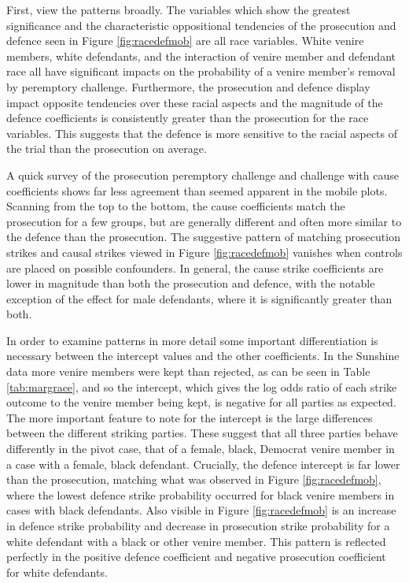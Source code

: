 First, view the patterns broadly. The variables which show the greatest significance and the characteristic
oppositional tendencies of the prosecution and defence seen in Figure \ref{fig:racedefmob} are all race variables. White venire members, white
defendants, and the interaction of venire member and defendant race all have significant impacts on the probability of a venire member's removal by peremptory challenge. Furthermore, the prosecution and defence display impact opposite tendencies over these racial aspects and
the magnitude of the defence coefficients is consistently greater than the prosecution for the race variables. This suggests that the defence is more sensitive to the racial aspects of the trial than the prosecution on average.

A quick survey of the prosecution peremptory challenge and challenge with cause coefficients shows far less agreement than seemed apparent in the mobile
plots. Scanning from the top to the bottom, the cause coefficients match the prosecution for a few groups, but are generally
different and often more similar to the defence than the prosecution. The suggestive pattern of matching prosecution strikes
and causal strikes viewed in Figure \ref{fig:racedefmob} vanishes when controls are placed on possible confounders. In general, the cause strike
coefficients are lower in magnitude than both the prosecution and defence, with the notable exception of the effect for male
defendants, where it is significantly greater than both.

In order to examine patterns in more detail some important differentiation is necessary between the intercept values and the other
coefficients. In the Sunshine data more venire members were kept than rejected, as can be seen in Table \ref{tab:margrace}, and so the intercept, which gives the log odds ratio of each strike outcome to the venire member being kept, is negative for all parties as expected. The more important feature to note for the intercept is the large differences between the different striking parties. These suggest that all three parties behave differently in the pivot case, that of a female, black, Democrat venire member in a case with a female, black defendant. Crucially, the defence intercept is
far lower than the prosecution, matching what was observed in Figure \ref{fig:racedefmob}, where the lowest defence strike
probability occurred for black venire members in cases with black
defendants. Also visible in Figure \ref{fig:racedefmob} is an increase in
defence strike probability and decrease in prosecution strike probability for a white defendant with a black or other venire
member. This pattern is reflected perfectly in the positive defence coefficient and negative prosecution coefficient for white
defendants.

